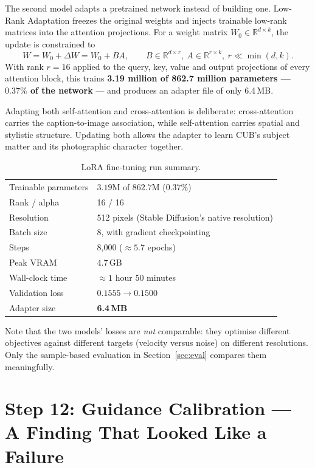 \documentclass[11pt,a4paper]{article}
\newcommand{\step}[1]{\section{#1}}
\begin{document}
The second model adapts a pretrained network instead of building one. Low-Rank
Adaptation freezes the original weights and injects trainable low-rank matrices
into the attention projections. For a weight matrix $W_0 \in \mathbb{R}^{d\times
k}$, the update is constrained to
\begin{equation}
W = W_0 + \Delta W = W_0 + BA, \qquad B \in \mathbb{R}^{d\times r},\ A \in \mathbb{R}^{r\times k},\ r \ll \min(d,k).
\end{equation}
With rank $r=16$ applied to the query, key, value and output projections of
every attention block, this trains \textbf{3.19 million of 862.7 million
parameters --- $0.37\%$ of the network} --- and produces an adapter file of only
6.4\,MB.

Adapting both self-attention and cross-attention is deliberate:
cross-attention carries the caption-to-image association, while self-attention
carries spatial and stylistic structure. Updating both allows the adapter to
learn CUB's subject matter and its photographic character together.

\begin{table}[htbp]
\centering
\caption{LoRA fine-tuning run summary.}
\begin{tabularx}{0.92\textwidth}{@{}lX@{}}
\toprule
Trainable parameters & $3.19$M of $862.7$M ($0.37\%$) \\
Rank / alpha & 16 / 16 \\
Resolution & 512 pixels (Stable Diffusion's native resolution) \\
Batch size & 8, with gradient checkpointing \\
Steps & 8{,}000 ($\approx 5.7$ epochs) \\
Peak VRAM & 4.7\,GB \\
Wall-clock time & $\approx 1$ hour 50 minutes \\
Validation loss & $0.1555 \rightarrow \mathbf{0.1500}$ \\
Adapter size & \textbf{6.4\,MB} \\
\bottomrule
\end{tabularx}
\end{table}

Note that the two models' losses are \emph{not} comparable: they optimise
different objectives against different targets (velocity versus noise) on
different resolutions. Only the sample-based evaluation in
Section~\ref{sec:eval} compares them meaningfully.

\step{Step 12: Guidance Calibration --- A Finding That Looked Like a Failure}
\label{sec:cfg}
\end{document}
